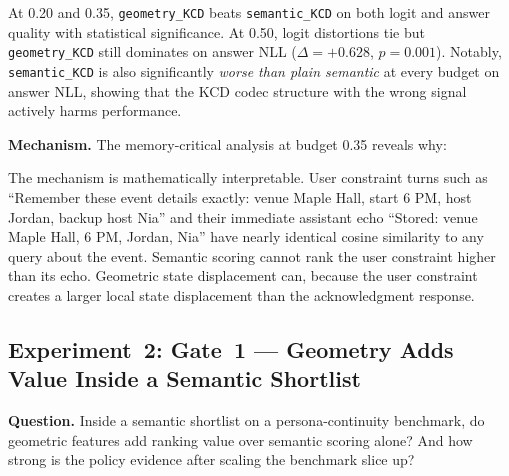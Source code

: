 \documentclass[conference]{IEEEtran}
\begin{document}
At 0.20 and 0.35, \texttt{geometry\_KCD} beats \texttt{semantic\_KCD} on both logit and answer quality with statistical significance. At 0.50, logit distortions tie but \texttt{geometry\_KCD} still dominates on answer NLL ($\Delta = +0.628$, $p=0.001$). Notably, \texttt{semantic\_KCD} is also significantly \emph{worse than plain semantic} at every budget on answer NLL, showing that the KCD codec structure with the wrong signal actively harms performance.

\textbf{Mechanism.} The memory-critical analysis at budget 0.35 reveals why:

\begin{table}[t]
    \centering
    \caption{Support-turn rescue comparison at budget 0.35: geometry\_KCD vs.\ semantic\_KCD.}
    \label{tab:exp1_mechanism}
\end{table}

The mechanism is mathematically interpretable. User constraint turns such as ``Remember these event details exactly: venue Maple Hall, start 6 PM, host Jordan, backup host Nia'' and their immediate assistant echo ``Stored: venue Maple Hall, 6 PM, Jordan, Nia'' have nearly identical cosine similarity to any query about the event. Semantic scoring cannot rank the user constraint higher than its echo. Geometric state displacement can, because the user constraint creates a larger local state displacement than the acknowledgment response.

\subsection{Experiment~2: Gate~1 --- Geometry Adds Value Inside a Semantic Shortlist}
\label{sec:gate1}
\textbf{Question.} Inside a semantic shortlist on a persona-continuity benchmark, do geometric features add ranking value over semantic scoring alone? And how strong is the policy evidence after scaling the benchmark slice up?
\end{document}
